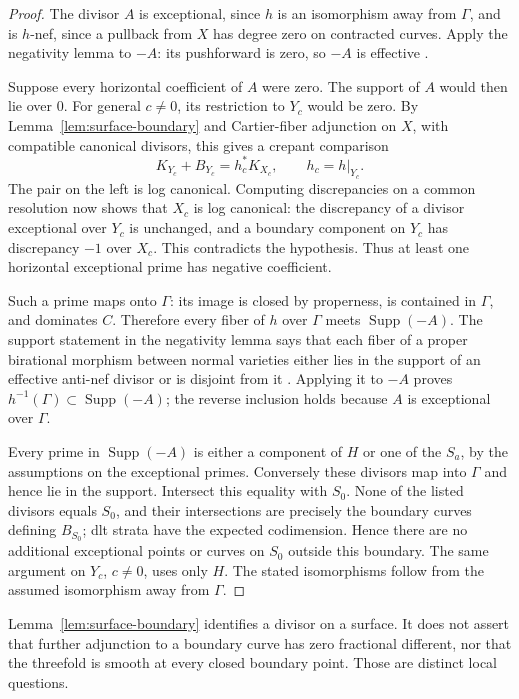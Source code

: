 \begin{proof}
The divisor $A$ is exceptional, since $h$ is an isomorphism away from
$\Gamma$, and is $h$-nef, since a pullback from $X$ has degree zero on
contracted curves.  Apply the negativity lemma to $-A$: its pushforward
is zero, so $-A$ is effective
\cite[Lemma~4.16(1)]{Fujino2011}.

Suppose every horizontal coefficient of $A$ were zero.  The support of
$A$ would then lie over $0$.  For general $c\ne0$, its restriction to
$Y_c$ would be zero.  By Lemma~\ref{lem:surface-boundary} and Cartier-fiber
adjunction on $X$, with compatible canonical divisors, this gives a
crepant comparison
\[
 K_{Y_c}+B_{Y_c}=h_c^*K_{X_c},\qquad h_c=h|_{Y_c}.
\]
The pair on the left is log canonical.  Computing discrepancies on a
common resolution now shows that $X_c$ is log canonical: the discrepancy
of a divisor exceptional over $Y_c$ is unchanged, and a boundary component
on $Y_c$ has discrepancy $-1$ over $X_c$.  This contradicts the hypothesis.
Thus at least one horizontal exceptional prime has negative coefficient.

Such a prime maps onto $\Gamma$: its image is closed by properness, is
contained in $\Gamma$, and dominates $C$.  Therefore every fiber of $h$
over $\Gamma$ meets $\operatorname{Supp}(-A)$.  The support statement in
the negativity lemma says that each fiber of a proper birational morphism
between normal varieties either lies in the support of an effective
anti-nef divisor or is disjoint from it
\cite[Lemma~4.16(2)]{Fujino2011}.  Applying it to $-A$ proves
$h^{-1}(\Gamma)\subset\operatorname{Supp}(-A)$; the reverse inclusion
holds because $A$ is exceptional over $\Gamma$.

Every prime in $\operatorname{Supp}(-A)$ is either a component of $H$ or
one of the $S_a$, by the assumptions on the exceptional primes.
Conversely these divisors map into $\Gamma$ and hence lie in the support.
Intersect this equality with $S_0$.  None of the listed divisors equals
$S_0$, and their intersections are precisely the boundary curves defining
$B_{S_0}$; dlt strata have the expected codimension.  Hence there are no
additional exceptional points or curves on $S_0$ outside this boundary.
The same argument on $Y_c$, $c\ne0$, uses only $H$.  The stated
isomorphisms follow from the assumed isomorphism away from $\Gamma$.
\end{proof}

\begin{remark}
Lemma~\ref{lem:surface-boundary} identifies a divisor on a surface.  It
does not assert that further adjunction to a boundary curve has zero
fractional different, nor that the threefold is smooth at every closed
boundary point.  Those are distinct local questions.
\end{remark}
